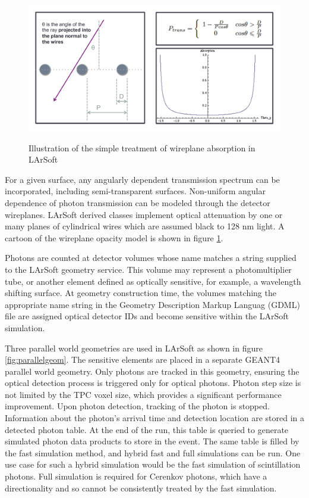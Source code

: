 \documentclass[12pt]{elsarticle}
\begin{document}
\begin{figure}[h]
\centering
\caption{Illustration of the simple treatment of wireplane absorption in LArSoft}
\includegraphics[width=6.0in]{./mtrls/imgs/WireplaneTransmissionCartoon.pdf}
\label{fig:wireplaneabs}
\end{figure}

For a given surface, any angularly dependent transmission spectrum can be incorporated, including semi-transparent surfaces.  Non-uniform angular dependence of photon transmission can be modeled through the detector wireplanes.    LArSoft derived classes implement optical attenuation by one or many planes of cylindrical wires which are assumed black to 128 nm light.  A cartoon of the wireplane opacity model is shown in figure \ref{fig:wireplaneabs}.

Photons are counted at detector volumes whose name matches a string supplied to the LArSoft geometry service.  This volume may represent a photomultiplier tube, or another element defined as optically sensitive, for example, a wavelength shifting surface. At geometry construction time, the volumes matching the appropriate name string in the Geometry Description Markup Languag (GDML) file are assigned optical detector IDs and become sensitive within the LArSoft simulation.

Three parallel world geometries are used in LArSoft as shown in figure \ref{fig:parallelgeom}.
The sensitive elements are placed in a separate GEANT4 parallel world geometry.  Only photons are tracked in this geometry, ensuring the optical  detection process is triggered only for optical photons.  Photon step size is not limited by the TPC voxel size, which provides a significant performance improvement. Upon photon detection, tracking of the photon is stopped. Information about the photon's arrival time and detection location are stored in a detected photon table.  At the end of the run, this table is queried to generate simulated photon data products to store in the event.  The same table is filled by the fast simulation method, and hybrid fast and full simulations can be run.  One use case for such a hybrid simulation would be the fast simulation of scintillation photons. Full simulation is required for Cerenkov photons, which have a directionality and so cannot be consistently treated by the fast simulation.
\end{document}
